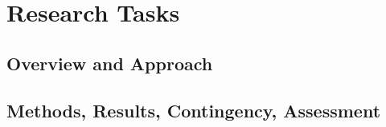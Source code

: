 
\section{Research Tasks}
\label{section-researchtasks}

\subsection{Overview and Approach}
\label{subsection-overviewandapproach}

\subsection{Methods, Results, Contingency, Assessment}
\label{subsection-methodsresults}



%
%
%
%

